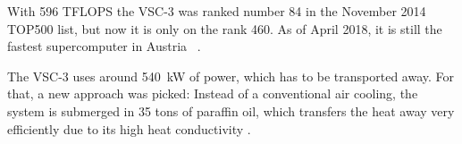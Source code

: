 With 596 TFLOPS the VSC-3 was ranked number 84 in the November 2014 TOP500 list, but now it is only on the rank 460.  As of April 2018, it is still the fastest supercomputer in Austria ~\cite{top500n_VSC3}. 

The VSC-3 uses around 540~kW of power, which has to be transported away. For that, a new approach was picked: Instead of a conventional air cooling, the system is submerged in 35 tons of paraffin oil, which transfers the heat away very efficiently due to its high heat conductivity \cite{vsc_oil}.



